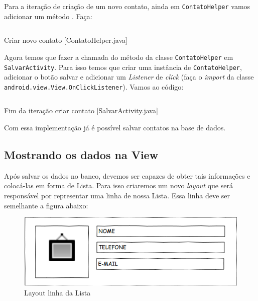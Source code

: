 Para a iteração de criação de um novo contato, ainda em \texttt{ContatoHelper} vamos adicionar um método
. Faça:

\begin{listing}[H]
  \inputminted[linenos=true,frame=bottomline,tabsize=3]{ java }{ source/ContatoHelper-2.java }
  \caption{Criar novo contato [ContatoHelper.java]}
\end{listing}

Agora temos que fazer a chamada do método  da classe \texttt{ContatoHelper} em
\texttt{SalvarActivity}. Para isso temos que criar uma instância de \texttt{ContatoHelper}, adicionar
o botão salvar e adicionar um \textit{Listener} de \textit{click} (faça o \textit{import}
da classe\\ \texttt{android.view.View.OnClickListener}). Vamos ao código:

\begin{listing}[H]
  \inputminted[linenos=true,frame=bottomline,tabsize=3]{ java }{ source/SalvarActivity-2.java }
  \caption{Fim da iteração criar contato [SalvarActivity.java]}
\end{listing}

Com essa implementação já é possível salvar contatos na base de dados.

\subsection{Mostrando os dados na View\label{ssec:listview}}

Após salvar os dados no banco, devemos ser capazes de obter tais informações e colocá-las em forma
de Lista. Para isso criaremos um novo \textit{layout} que será responsável por representar uma linha
de nossa Lista. Essa linha deve ser semelhante a figura abaixo:

\begin{figure}[h]
\centering
\includegraphics[scale=0.6]{img/layout-linha.png}
\caption{Layout linha da Lista}
\end{figure}

